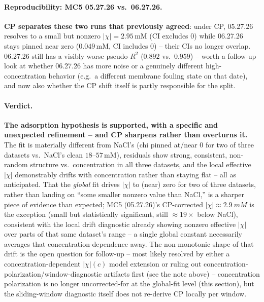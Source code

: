 \documentclass[11pt]{article}
\begin{document}
\paragraph{Reproducibility: MC5 05.27.26 vs.\ 06.27.26.} \textbf{CP separates
these two runs that previously agreed}: under CP, 05.27.26 resolves to a small
but nonzero $|\chi|=2.95$\,mM (CI excludes 0) while 06.27.26 stays pinned near
zero ($0.049$\,mM, CI includes 0) -- their CIs no longer overlap. 06.27.26 still
has a visibly worse pseudo-$R^2$ ($0.892$ vs.\
$0.959$) -- worth a follow-up
look at whether 06.27.26 has more noise or a genuinely different
high-concentration behavior (e.g.\ a different membrane fouling state on that
date), and now also whether the CP shift itself is partly responsible for the
split.

\paragraph{Verdict.} \textbf{The adsorption hypothesis is supported, with a
specific and unexpected refinement -- and CP sharpens rather than overturns
it.} The fit is materially different from NaCl's (chi pinned at/near $0$ for
two of three datasets vs.\ NaCl's clean $18$--$57$\,mM), residuals
show strong, consistent, non-random structure vs.\ concentration in all three
datasets, and the local effective $|\chi|$ demonstrably drifts with
concentration rather than staying flat -- all as anticipated. That the
\emph{global} fit drives $|\chi|$ to (near) zero for two of three datasets,
rather than landing on ``some smaller nonzero value than NaCl,'' is a sharper
piece of evidence than expected; MC5 (05.27.26)'s CP-corrected
$|\chi|\approx\SI{2.9}{mM}$ is the exception (small but statistically
significant, still $\approx19\times$ below NaCl), consistent with the local drift
diagnostic already showing nonzero effective $|\chi|$ over parts of that same
dataset's range -- a single global constant necessarily averages that
concentration-dependence away. The non-monotonic shape of that drift is the
open question for follow-up --
most likely resolved by either a concentration-dependent $|\chi|(c)$ model
extension or ruling out concentration-polarization/window-diagnostic artifacts
first (see the note above) -- concentration polarization is no longer
uncorrected-for at the global-fit level (this section), but the sliding-window
diagnostic itself does not re-derive CP locally per window.

\end{document}
